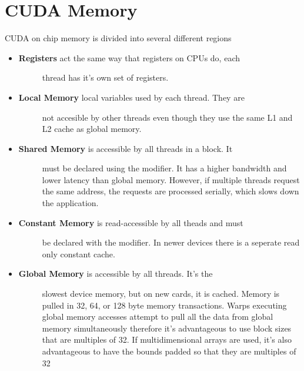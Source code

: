 \documentclass[letterpaper,10pt,openany,oneside]{sphinxmanual}
\begin{document}
\section{CUDA Memory}
\label{0-Architecture/Architecture:cuda-memory}
CUDA on chip memory is divided into several different regions
\begin{itemize}
\item {} \begin{description}
\item[{\textbf{Registers} act the same way that registers on CPUs do, each}] \leavevmode
thread has it's own set of registers.

\end{description}

\item {} \begin{description}
\item[{\textbf{Local Memory} local variables used by each thread. They are}] \leavevmode
not accesible by other threads even though they use the same
L1 and L2 cache as global memory.

\end{description}

\item {} \begin{description}
\item[{\textbf{Shared Memory} is accessible by all threads in a block. It}] \leavevmode
must be declared using the  modifier. It has a
higher bandwidth and lower latency than global memory. However, if
multiple threads request the same address, the requests are
processed serially, which slows down the application.

\end{description}

\item {} \begin{description}
\item[{\textbf{Constant Memory} is read-accessible by all theads and must}] \leavevmode
be declared with the  modifier. In newer devices
there is a seperate read only constant cache.

\end{description}

\item {} \begin{description}
\item[{\textbf{Global Memory} is accessible by all threads. It's the}] \leavevmode
slowest device memory, but on new cards, it is cached. Memory
is pulled in 32, 64, or 128 byte memory transactions. Warps
executing global memory accesses attempt to pull all the data
from global memory simultaneously therefore it's advantageous
to use block sizes that are multiples of 32. If
multidimensional arrays are used, it's also advantageous to
have the bounds padded so that they are multiples of 32


\end{description}
\end{itemize}
\end{document}
